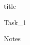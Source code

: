 \documentclass[]{article}
\begin{document}
{title}

\frontmatter

\tableofcontents

\mainmatter

{Task_1}

{Notes}


\end{document}

